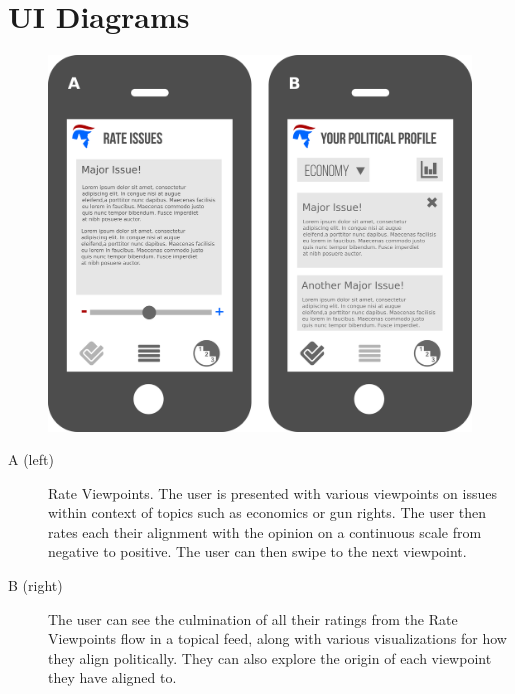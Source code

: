 \documentclass[11pt]{article}
\begin{document}
\newpage

\section{UI Diagrams}

\begin{figure}[h]
    \includegraphics[width = \textwidth]{first.png}
\end{figure}

\begin{description}
    \item[A (left)] Rate Viewpoints. The user is presented with various viewpoints on issues within context of topics such as economics or gun rights. The user then rates each their alignment with the opinion on a continuous scale from negative to positive. The user can then swipe to the next viewpoint.
    \item[B (right)] The user can see the culmination of all their ratings from the Rate Viewpoints flow in a topical feed, along with various visualizations for how they align politically. They can also explore the origin of each viewpoint they have aligned to. 
\end{description}

\newpage
\end{document}
